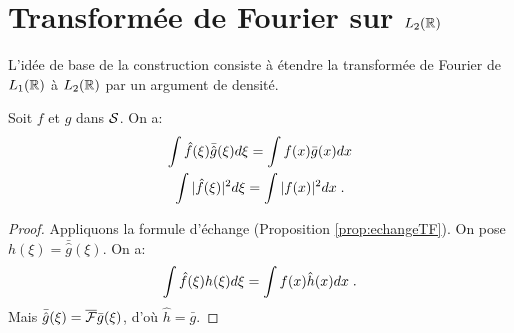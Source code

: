 \section{Transform{\'e}e de Fourier sur $L_2(\mathbb{R})$}
L'id{\'e}e de base de la construction consiste {\`a} {\'e}tendre la transform{\'e}e de Fourier
de $L_1(\mathbb{R})$ {\`a} $L_2(\mathbb{R})$ par un argument de densit{\'e}.
\begin{proposition}
\label{prop:plancherelparseval}
Soit $f$ et $g$ dans $\mathcal{S}$. On a:
\begin{gather*}
\int \hat{f}(\xi) \bar{\hat{g}}(\xi) d \xi = \int f(x) \bar{g}(x) dx \\
\int |\hat{f}(\xi)|^2 d \xi = \int |f(x)|^2 dx \;.
\end{gather*}
\end{proposition}
\begin{proof}
Appliquons la formule d'{\'e}change (Proposition \ref{prop:echangeTF}). On pose $h(\xi)= \bar{\hat{g}}(\xi)$. On a:
$$
\int \hat{f}(\xi) h(\xi) d \xi = \int f(x) \hat{h}(x) dx \;.
$$
Mais $\bar{\hat{g}}(\xi)= \overline{\mathcal{F}} \bar{g}(\xi)$, d'o{\`u} $\hat{h}= \bar{g}$.
\end{proof}


